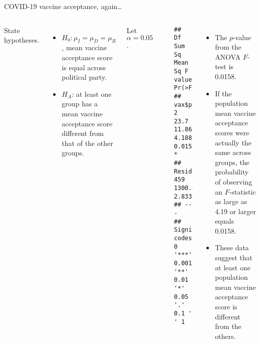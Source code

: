 \documentclass[
  ignorenonframetext,
  aspectratio=169]{beamer}
\newenvironment{Shaded}{\begin{snugshade}}{\end{snugshade}}
\newcommand{\FunctionTok}[1]{\textcolor[rgb]{0.13,0.29,0.53}{\textbf{#1}}}
\newcommand{\NormalTok}[1]{#1}
\newcommand{\SpecialCharTok}[1]{\textcolor[rgb]{0.81,0.36,0.00}{\textbf{#1}}}
\newcommand{\columnsbegin}{\begin{columns}}
\newcommand{\columnsend}{\end{columns}}
\begin{document}
\begin{frame}[fragile]{COVID-19 vaccine acceptance, again\ldots{}}
\protect\hypertarget{covid-19-vaccine-acceptance-again-2}{}
\columnsbegin


\footnotesize

State hypotheses.

\begin{itemize}
\item
  \(H_0: \mu_I = \mu_D = \mu_R\), mean vaccine acceptance score is equal
  across political party.
\item
  \(H_A\): at least one group has a mean vaccine acceptance score
  different from that of the other groups.
\end{itemize}

\vspace{0.5cm}

Let \(\alpha = 0.05\).


\scriptsize

\begin{Shaded}
\end{Shaded}

\begin{verbatim}
##              Df Sum Sq Mean Sq F value Pr(>F)  
## vax$party3    2   23.7  11.864   4.188 0.0158 *
## Residuals   459 1300.4   2.833                 
## ---
## Signif. codes:  0 '***' 0.001 '**' 0.01 '*' 0.05 '.' 0.1 ' ' 1
\end{verbatim}

\footnotesize

\begin{itemize}
\item
  The \(p\)-value from the ANOVA \(F\)-test is 0.0158.
\item
  If the population mean vaccine acceptance scores were actually the
  same across groups, the probability of observing an \(F\)-statistic as
  large as 4.19 or larger equals 0.0158.
\item
  These data suggest that at least one population mean vaccine
  acceptance score is different from the others.
\end{itemize}

\columnsend
\end{frame}
\end{document}

